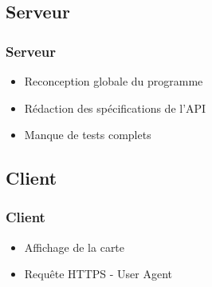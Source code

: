 \subsection{Serveur}
	\begin{frame}
		\frametitle{Serveur}
        \begin{itemize}
            \item Reconception globale du programme \newline
            \item Rédaction des spécifications de l'API \newline
            \item Manque de tests complets \newline
        \end{itemize}
	\end{frame}

\subsection{Client}
	\begin{frame}
		\frametitle{Client}
		\begin{itemize}
			\item Affichage de la carte
			\item Requête HTTPS - User Agent
		\end{itemize}
	\end{frame}
